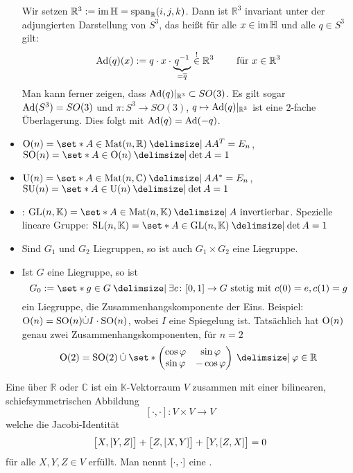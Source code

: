 \begin{itemize}
	Wir setzen $\mathbb{R}^3 := \im \mathbb{H} = \Span_\mathbb{R} (i,j,k)$.
	Dann ist $\mathbb{R}^3$ invariant unter der adjungierten Darstellung von $S^3$, das heißt für alle $x \in \im \mathbb{H}$ und alle $q \in S^3$ gilt:
	\[
		\Ad(q)(x) := q \cdot x \cdot \Underbrace{q^{-1}}{=\overline{q}} \stackrel{!}{\in} \mathbb{R}^3 \qquad \text{ für } x \in \mathbb{R}^3 
	\]
	Man kann ferner zeigen, dass $\Ad(q)|_{\mathbb{R}^3} \subset SO(3)$.
	Es gilt sogar $\Ad(S^3) = SO(3)$ und $\pi \colon S^3 \to SO(3)$, $q \mapsto \Ad(q)|_{\mathbb{R}^3}$ ist eine $2$-fache Überlagerung.
	Dies folgt mit $\Ad(q)=\Ad(-q)$.
	\item {} $\On(n) = \set*{A \in \Mat(n,\mathbb{R}) \given A A^T = E_n}$, $\SO(n) = \set*{A \in \On(n) \given \det A=1}$
	\item {} $\Un(n) = \set*{A \in \Mat (n,\mathbb{C}) \given A A^* =E_n}$, $\SU(n) = \set*{A \in \Un(n) \given \det A=1}$
	\item {}: $\GL(n,\mathbb{K}) = \set*{A \in \Mat(n,\mathbb{K}) \given A \text{ invertierbar}}$. Spezielle lineare Gruppe:
	$\SL(n,\mathbb{K}) = \set*{A \in \GL(n,\mathbb{K}) \given \det A =1}$
	\item Sind $G_1$ und $G_2$ Liegruppen, so ist auch $G_1 \times G_2$ eine Liegruppe.
	\item Ist $G$ eine Liegruppe, so ist 
	\[
		G_0 :=  \set*{g \in G \given \exists c \colon [0,1] \to G \text{ stetig mit } c(0)=e, c(1)=g}
	\]
	ein Liegruppe, die Zusammenhangskomponente der Eins.
	Beispiel: $\On(n)=\SO(n) \dot{\cup} I \cdot \SO(n)$, wobei $I$ eine Spiegelung ist.
	Tatsächlich hat $\On(n)$ genau zwei Zusammenhangskomponenten, für $n=2$
	\[
		\On(2) = \SO(2) \mathbin{\dot{\cup}} \set*{\begin{pmatrix}
			\cos \varphi & \sin \varphi \\
			\sin \varphi & - \cos \varphi
		\end{pmatrix} \given \varphi \in \mathbb{R}}
	\]
\end{itemize}

\begin{definition}
	Eine  über $\mathbb{R}$ oder $\mathbb{C}$ ist ein $\mathbb{K}$-Vektorraum $V$ zusammen mit einer bilinearen, schiefsymmetrischen Abbildung 
	\[
		[\cdot ,\cdot ] \colon V \times V \to V
	\]
	welche die Jacobi-Identität 
	\[
		\benbrace[\big]{X, \benbrace*{Y,Z}} + \benbrace[\big]{Z, \benbrace*{X,Y}} + \benbrace[\big]{Y, \benbrace*{Z,X}} =0
	\]
	für alle $X,Y,Z \in V$ erfüllt.
	Man nennt $\benbrace*{\cdot ,\cdot }$ eine . 
\end{definition}

